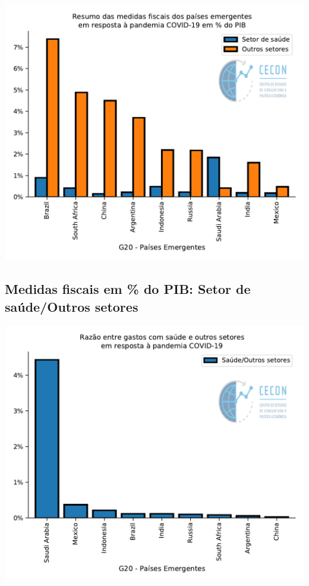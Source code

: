 \documentclass{SelfArx}
\begin{document}
\begin{center}
\includegraphics[width=.9\linewidth]{./figs/IMF/FiscalMonitor_Covid.pdf}
\end{center}

\subsection*{Medidas fiscais em \% do PIB: Setor de saúde/Outros setores}
\label{sec:orgbf7cb24}

\begin{center}
\includegraphics[width=.9\linewidth]{./figs/IMF/FiscalMonitor_Covid_ratio.pdf}
\end{center}
\end{document}

